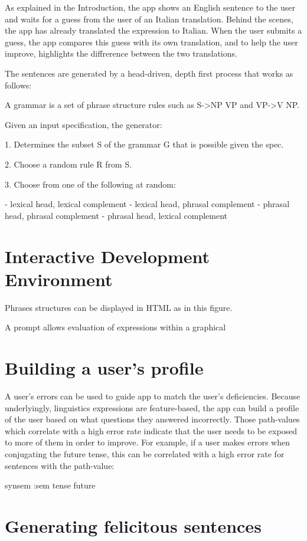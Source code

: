 \documentclass[11pt]{article}
\begin{document}
As explained in the Introduction, the app shows an English sentence to
the user and waits for a guess from the user of an Italian
translation. Behind the scenes, the app has already translated the
expression to Italian. When the user submits a guess, the app compares
this guess with its own translation, and to help the user improve,
highlights the diffrerence between the two translations. 

The sentences are generated by a head-driven, depth first process that
works as follows:

A grammar is a set of phrase structure rules such as S->NP VP and
VP->V NP.

Given an input specification, the generator:

1. Determines the subset S of the grammar G that is possible given the
spec.

2. Choose a random rule R from S.

3. Choose from one of the following at random:

   - lexical head, lexical complement
   - lexical head, phrasal complement
   - phrasal head, phrasal complement
   - phrasal head, lexical complement

\section{Interactive Development Environment}

Phrases structures can be displayed in HTML as in this figure.

A prompt allows evaluation of expressions within a graphical 

\section{Building a user's profile}

A user's errors can be used to guide app to match the user's
deficiencies. Because underlyingly, linguistics expressions are
feature-based, the app can build a profile of the user based on what
questions they answered incorrectly. Those path-values which
correlate with a high error rate indicate that the user needs to be
exposed to more of them in order to improve. For example, if a user
makes errors when conjugating the future tense, this can be correlated
with a high error rate for sentences with the path-value:

   {synsem {:sem {tense future}}}
 
\section{Generating felicitous sentences}
\end{document}

